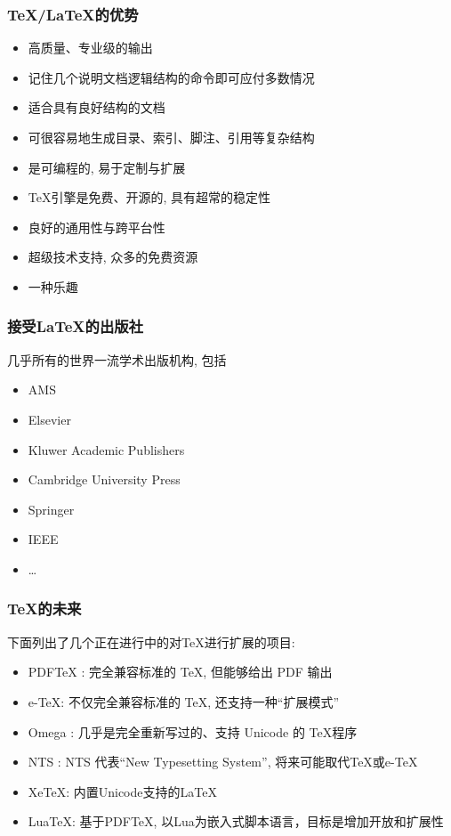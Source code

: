 \documentclass[compress]{beamer}
\begin{document}
\begin{frame}
\frametitle{\TeX{}/\LaTeX{}的优势}

\begin{itemize}

\item 高质量、专业级的输出
\item 记住几个说明文档逻辑结构的命令即可应付多数情况
\item 适合具有良好结构的文档
\item 可很容易地生成目录、索引、脚注、引用等复杂结构
\item 是可编程的, 易于定制与扩展
\item \TeX{}引擎是免费、开源的, 具有超常的稳定性
\item 良好的通用性与跨平台性
\item 超级技术支持, 众多的免费资源
\item 一种乐趣
\end{itemize}

\end{frame}



\begin{frame}
\frametitle{接受\LaTeX{}的出版社}
几乎所有的世界一流学术出版机构, 包括
\begin{itemize}
\item AMS
\item Elsevier
\item Kluwer Academic Publishers
\item Cambridge University Press
\item Springer
\item IEEE
\item \ldots
\end{itemize}
\end{frame}

\begin{frame}
\frametitle{\TeX{}的未来}

下面列出了几个正在进行中的对\TeX{}进行扩展的项目:

\begin{itemize}
\item PDFTeX : 完全兼容标准的 \TeX , 但能够给出 PDF 输出
\item e-\TeX : 不仅完全兼容标准的 \TeX , 还支持一种``扩展模式''
\item Omega : 几乎是完全重新写过的、支持 Unicode 的 \TeX 程序
\item NTS : NTS 代表``New Typesetting System'', 将来可能取代\TeX{}或e-\TeX
\item XeTeX: 内置Unicode支持的\LaTeX
\item LuaTeX: 基于PDFTeX, 以Lua为嵌入式脚本语言，目标是增加开放和扩展性
\end{itemize}

\end{frame}
\end{document}
